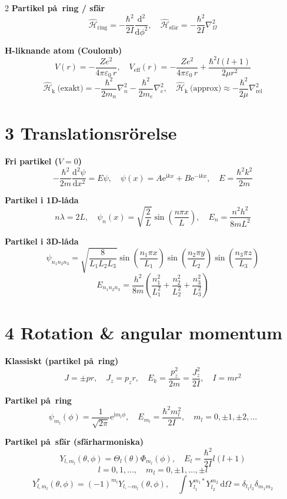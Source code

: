 \documentclass[10pt,a4paper]{article}
\newcommand{\dd}{\mathrm{d}}
\newcommand{\ii}{\mathrm{i}}
\newcommand{\e}{\mathrm{e}}
\newcommand{\epsz}{\varepsilon_0}
\newcommand{\HH}{\widehat{\mathcal{H}}}
\newcommand{\Hk}{\widehat{\mathcal{H}}_{\mathrm{k}}}
\begin{document}
\begin{multicols*}{2}
\textbf{Partikel p\aa\ ring / sf\"ar}
\[
\HH_{\text{ring}}=-\frac{\hbar^2}{2I}\frac{\dd^2}{\dd\phi^2},\quad
\HH_{\text{sf\"ar}}=-\frac{\hbar^2}{2I}\nabla^2_{\Omega}
\]

\textbf{H-liknande atom (Coulomb)}
\[
V(r)=-\frac{Ze^2}{4\pi\epsz\,r},\quad
V_{\text{eff}}(r)= -\frac{Ze^2}{4\pi\epsz\,r}+\frac{\hbar^2 l(l+1)}{2\mu r^2}
\]
\[
\Hk\ \text{(exakt)}=-\frac{\hbar^2}{2m_n}\nabla_n^2-\frac{\hbar^2}{2m_e}\nabla_e^2,\quad
\Hk\ \text{(approx)}\approx-\frac{\hbar^2}{2\mu}\nabla_{\text{rel}}^2
\]

\section*{3 Translationsr\"orelse}
\textbf{Fri partikel ($V=0$)}
\[
-\frac{\hbar^2}{2m}\frac{\dd^2\psi}{\dd x^2}
=
E\psi,\quad
\psi(x)=A\e^{\ii kx}+B\e^{-\ii kx},\quad
E=\frac{\hbar^2 k^2}{2m}
\]

\textbf{Partikel i 1D-l\aa da}
\[
 n\lambda=2L,\quad
\psi_n(x)=\sqrt{\frac{2}{L}}\sin\!\left(\frac{n\pi x}{L}\right),\quad
E_n=\frac{n^2h^2}{8mL^2}
\]

\textbf{Partikel i 3D-l\aa da}
\[
\psi_{n_1n_2n_3}=\sqrt{\frac{8}{L_1L_2L_3}}
\sin\!\left(\frac{n_1\pi x}{L_1}\right)
\sin\!\left(\frac{n_2\pi y}{L_2}\right)
\sin\!\left(\frac{n_3\pi z}{L_3}\right)
\]
\[
E_{n_1n_2n_3}=\frac{h^2}{8m}\left(\frac{n_1^2}{L_1^2}+\frac{n_2^2}{L_2^2}+\frac{n_3^2}{L_3^2}\right)
\]

\section*{4 Rotation \& angular momentum}

\textbf{Klassiskt (partikel p\aa\ ring)}
\[
J=\pm pr,\quad J_z=p_z r,\quad E_k=\frac{p_z^2}{2m}=\frac{J_z^2}{2I},\quad I=mr^2
\]

\textbf{Partikel p\aa\ ring}
\[
\psi_{m_l}(\phi)=\frac{1}{\sqrt{2\pi}}\e^{\ii m_l\phi},\quad
E_{m_l}=\frac{\hbar^2 m_l^2}{2I},\quad m_l=0,\pm1,\pm2,\dots
\]

\textbf{Partikel p\aa\ sf\"ar (sf\"arharmoniska)}
\[
Y_{l,m_l}(\theta,\phi)=\Theta_l(\theta)\Phi_{m_l}(\phi),\quad
E_l=\frac{\hbar^2}{2I}l(l+1)
\]
\[l=0,1,\dots,\quad m_l=0,\pm1,\dots,\pm l
\]
\[
Y_{l,m_l}^*(\theta,\phi)=(-1)^{m_l}Y_{l,-m_l}(\theta,\phi),\quad
\int Y_{l_1}^{m_1*}Y_{l_2}^{m_2}\,\dd\Omega=\delta_{l_1l_2}\delta_{m_1m_2}
\]


\end{multicols*}
\end{document}
